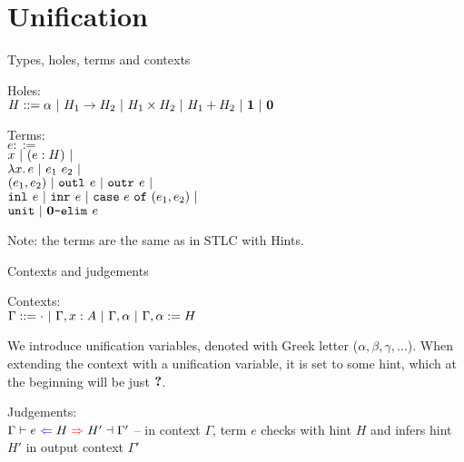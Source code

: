 \documentclass{beamer}
\begin{document}
\section{Unification}



\begin{frame}{Types, holes, terms and contexts}

Holes: \\
$H ::= \alpha \ |\  H_1 \to H_2 \ |\  H_1 \times H_2 \ |\  H_1 + H_2 \ |\  \textbf{1} \ |\  \textbf{0}$

\vspace{2em}

Terms: \\
$e ::=$ \\
\qquad $x \ |\  (e : H) \ |\  $ \\
\qquad $\fun{x}{e} \pipe \app{e_1}{e_2} \pipe$ \\
\qquad $(e_1, e_2) \ |\  \texttt{outl}_{}\ e \ |\  \texttt{outr}_{}\ e \ |\ $ \\
\qquad $\texttt{inl}_{}\ e \ |\  \texttt{inr}_{}\ e \ |\  \texttt{case}\ e\ \texttt{of}\ (e_1, e_2) \ |\ $ \\
\qquad $\texttt{unit} \ |\  \textbf{0}\texttt{-elim}_{}\ e$

\vspace{2em}

Note: the terms are the same as in STLC with Hints.

\end{frame}

\begin{frame}{Contexts and judgements}

Contexts: \\
$\Gamma ::= \emptytypingctx \pipe \extend{\Gamma}{x}{A} \pipe \extendunif{\Gamma}{\alpha} \pipe \extendunif{\Gamma}{\alpha}[H]$

\vspace{2em}

We introduce unification variables, denoted with Greek letter ($\alpha, \beta, \gamma, \dots$). When extending the context with a unification variable, it is set to some hint, which at the beginning will be just $\textbf{?}$.

\vspace{2em}

Judgements: \\
$\uniftyping[\Gamma]{e}{H}{H'}[\Gamma']$ -- in context $\Gamma$, term $e$ checks with hint $H$ and infers hint $H'$ in output context $\Gamma'$

\end{frame}
\end{document}
